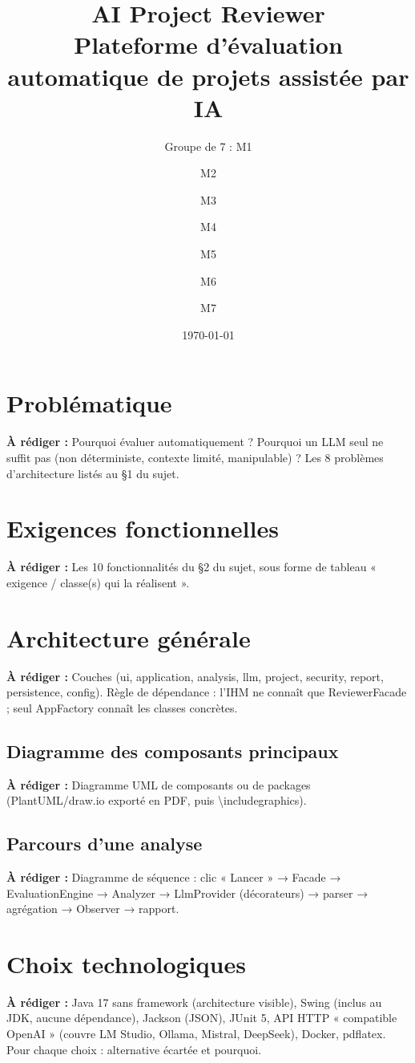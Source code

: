 \documentclass[11pt,a4paper]{report}
\title{AI Project Reviewer\\\large Plateforme d'évaluation automatique de projets assistée par IA}
\author{Groupe de 7 : M1 \and M2 \and M3 \and M4 \and M5 \and M6 \and M7}
\date{\today}
\newcommand{\todo}[1]{\par\noindent\colorbox{yellow!30}{\parbox{\dimexpr\linewidth-2\fboxsep}{\textbf{À rédiger :} #1}}\par}
\begin{document}
\maketitle
\tableofcontents

\chapter{Problématique}                                  %
\todo{Pourquoi évaluer automatiquement ? Pourquoi un LLM seul ne suffit pas (non déterministe, contexte limité, manipulable) ? Les 8 problèmes d'architecture listés au §1 du sujet.}

\chapter{Exigences fonctionnelles}                       %
\todo{Les 10 fonctionnalités du §2 du sujet, sous forme de tableau « exigence / classe(s) qui la réalisent ».}

\chapter{Architecture générale}                          %
\todo{Couches (ui, application, analysis, llm, project, security, report, persistence, config). Règle de dépendance : l'IHM ne connaît que ReviewerFacade ; seul AppFactory connaît les classes concrètes.}

\section{Diagramme des composants principaux}            %
\todo{Diagramme UML de composants ou de packages (PlantUML/draw.io exporté en PDF, puis \textbackslash includegraphics).}

\section{Parcours d'une analyse}                          %
\todo{Diagramme de séquence : clic « Lancer » → Facade → EvaluationEngine → Analyzer → LlmProvider (décorateurs) → parser → agrégation → Observer → rapport.}

\chapter{Choix technologiques}                           %
\todo{Java 17 sans framework (architecture visible), Swing (inclus au JDK, aucune dépendance), Jackson (JSON), JUnit 5, API HTTP « compatible OpenAI » (couvre LM Studio, Ollama, Mistral, DeepSeek), Docker, pdflatex. Pour chaque choix : alternative écartée et pourquoi.}
\end{document}
